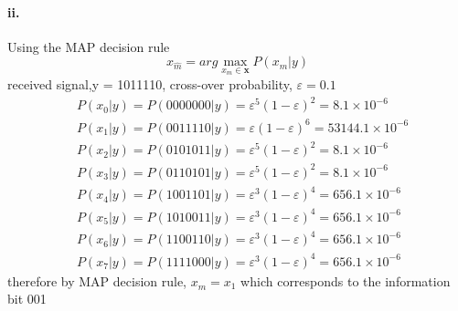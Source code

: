 \documentclass[24 pts]{article}
\begin{document}
\paragraph{ii.}Using the MAP decision rule
$$x_{\widehat{m}}=arg \max_{x_m\in \mathbf{x}} P(x_m|y)$$
received signal,y = 1011110, cross-over probability,  $\varepsilon =0.1$
\begin{equation*}
\begin{split}
 &P(x_0|y)= P(0000000|y)=\varepsilon^5(1-\varepsilon)^2=8.1\times 10^{-6}\\
 &P(x_1|y)= P(0011110|y)=\varepsilon(1-\varepsilon)^6=53144.1\times 10^{-6}\\
 &P(x_2|y)= P(0101011|y)=\varepsilon^5(1-\varepsilon)^2=8.1\times 10^{-6}\\
 &P(x_3|y)= P(0110101|y)=\varepsilon^5(1-\varepsilon)^2=8.1\times 10^{-6}\\
 &P(x_4|y)= P(1001101|y)=\varepsilon^3(1-\varepsilon)^4=656.1\times 10^{-6}\\
 &P(x_5|y)= P(1010011|y)=\varepsilon^3(1-\varepsilon)^4=656.1\times 10^{-6}\\
 &P(x_6|y)= P(1100110|y)=\varepsilon^3(1-\varepsilon)^4=656.1\times 10^{-6}\\
 &P(x_7|y)= P(1111000|y)=\varepsilon^3(1-\varepsilon)^4=656.1\times 10^{-6}
\end{split}
\end{equation*}
therefore by MAP decision rule, $x_{\widehat{m}}=x_1$ which corresponds to the information bit 001
\end{document}
